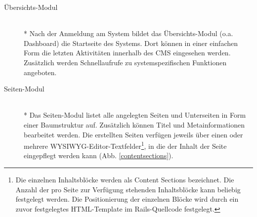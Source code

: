 \begin{description}
\item[Übersichts-Modul]\mbox{~}\\*
Nach der Anmeldung am System bildet das Übersichts-Modul (o.a. Dashboard) die Startseite des Systems. Dort können in einer einfachen Form die letzten Aktivitäten innerhalb des CMS eingesehen werden. Zusätzlich werden Schnellaufrufe zu systemspezifischen Funktionen angeboten.
\item[Seiten-Modul]\mbox{~}\\*
Das Seiten-Modul listet alle angelegten Seiten und Unterseiten in Form einer Baumstruktur auf. Zusätzlich können Titel und Metainformationen bearbeitet werden. Die erstellten Seiten verfügen jeweils über einen oder mehrere WYSIWYG-Editor-Textfelder\footnote{Die einzelnen Inhaltsblöcke werden als Content Sections bezeichnet. Die Anzahl der pro Seite zur Verfügung stehenden Inhaltsblöcke kann beliebig festgelegt werden. Die Positionierung der einzelnen Blöcke wird durch ein zuvor festgelegtes HTML-Template im Rails-Quellcode festgelegt.}, in die der Inhalt der Seite eingepflegt werden kann (Abb. \ref{contentsections}).


\end{description}
